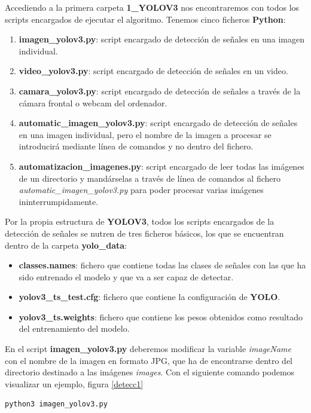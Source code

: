 Accediendo a la primera carpeta \textbf{1_YOLOV3} nos encontraremos con todos los scripts encargados de ejecutar el algoritmo. Tenemos cinco ficheros \textbf{Python}:

\begin{enumerate}
\item \textbf{imagen_yolov3.py}: script encargado de detección de señales en una imagen individual.
\item \textbf{video_yolov3.py}: script encargado de detección de señales en un video.
\item \textbf{camara_yolov3.py}: script encargado de detección de señales a través de la cámara frontal o webcam del ordenador.
\item \textbf{automatic_imagen_yolov3.py}: script encargado de detección de señales en una imagen individual, pero el nombre de la imagen a procesar se introducirá mediante línea de comandos y no dentro del fichero.
\item \textbf{automatizacion_imagenes.py}: script encargado de leer todas las imágenes de un directorio y mandárselas a través de línea de comandos al fichero \textit{automatic_imagen_yolov3.py} para poder procesar varias imágenes ininterrumpidamente.
\end{enumerate}

Por la propia estructura de \textbf{YOLOV3}, todos los scripts encargados de la detección de señales se nutren de tres ficheros básicos, los que se encuentran dentro de la carpeta \textbf{yolo_data}:
\begin{itemize}
\item \textbf{classes.names}: fichero que contiene todas las clases de señales con las que ha sido entrenado el modelo y que va a ser capaz de detectar.
\item \textbf{yolov3_ts_test.cfg}: fichero que contiene la configuración de \textbf{YOLO}.
\item \textbf{yolov3_ts.weights}: fichero que contiene los pesos obtenidos como resultado del entrenamiento del modelo.
\end{itemize}

En el script \textbf{imagen_yolov3.py} deberemos modificar la variable \textit{imageName} con el nombre de la imagen en formato JPG, que ha de encontrarse dentro del directorio destinado a las imágenes \textit{images}. Con el siguiente comando podemos visualizar un ejemplo, figura \ref{detecc1} 

\begin{lstlisting}
python3 imagen_yolov3.py
\end{lstlisting}

